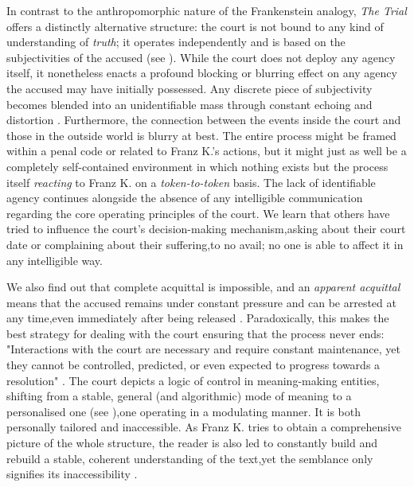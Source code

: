 In contrast to the anthropomorphic nature of the Frankenstein analogy,
\textit{The Trial} offers a distinctly alternative structure: the court is
not bound to any kind of understanding of \textit{truth}; it operates
independently and is based on the subjectivities of the accused (see
\cite[970]{dishon2024}). While the court does not deploy any agency itself, it
nonetheless enacts a profound blocking or blurring effect on any agency the accused
may have initially possessed. Any discrete piece of subjectivity becomes
blended into an unidentifiable mass through constant echoing and distortion
\parencite[970]{dishon2024}. Furthermore, the connection between the events
inside the court and those in the outside world is blurry at best. The entire process might be
framed within a penal code or related to Franz K.'s actions,
but it might just as well be a completely self-contained environment in which
nothing exists but the process itself \textit{reacting} to Franz K. on a
\textit{token-to-token} basis. The lack of identifiable agency continues alongside
the absence of any intelligible communication regarding the core operating principles of
the court. We learn that others have tried to influence the court’s decision-making
mechanism,asking about their court date or complaining about their suffering,to no avail; no one is able
to affect it in any intelligible way.

We also find out that complete acquittal is impossible, and an \textit{apparent
	acquittal} means that the accused remains under constant pressure and can be arrested at any time,even immediately after
being released \parencite[971]{dishon2024}. Paradoxically, this makes the best
strategy for dealing with the court ensuring that the process never ends: "Interactions with the court are necessary and require constant maintenance, yet they cannot be controlled, predicted, or even expected to progress towards a resolution" \parencite[971]{dishon2024}. The court depicts
a logic of control in meaning-making entities, shifting from a stable, general
(and algorithmic) mode of meaning to a personalised one (see \cite[971]{dishon2024}),one operating in a
modulating manner. It is both personally tailored and inaccessible. As Franz K.
tries to obtain a comprehensive picture of the whole structure, the reader is
also led to constantly build and rebuild a stable, coherent understanding
of the text,yet the semblance only signifies its inaccessibility \parencite[972]{dishon2024}.

